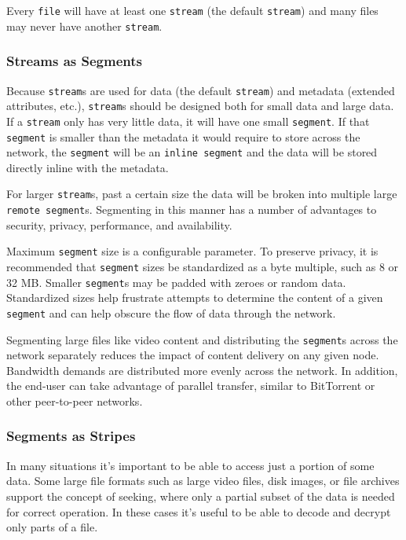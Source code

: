 \documentclass[a4paper,10pt]{article}
\newcommand{\x}[1]{{\tt #1}}
\begin{document}
Every \x{file} will have at least one \x{stream} (the default \x{stream}) and
many files may never have another \x{stream}.

\subsubsection{Streams as Segments}

Because \x{stream}s are used for data (the default \x{stream}) and metadata
(extended attributes, etc.), \x{stream}s should be designed both for small data
and large data. If a \x{stream} only has very little data, it will have one
small \x{segment}. If that \x{segment} is smaller than the metadata it would
require to store across the network, the \x{segment} will be an
\x{inline segment} and the data will be stored directly inline with the
metadata.

For larger \x{stream}s, past a certain size the data will be broken into
multiple large \x{remote segment}s. Segmenting in this manner has a number of
advantages to security, privacy, performance, and availability.

Maximum \x{segment} size is a configurable parameter. To preserve privacy, it is
recommended that \x{segment} sizes be standardized as a byte multiple, such as 8
or 32 MB. Smaller \x{segment}s may be padded with zeroes or random data.
Standardized sizes help frustrate attempts to determine the content of a given
\x{segment} and can help obscure the flow of data through the network.

Segmenting large files like video content and distributing the \x{segment}s
across the network separately reduces the impact of content delivery on any
given node.
Bandwidth demands are distributed more evenly across the network. In addition,
the end-user can take advantage of parallel transfer, similar to
BitTorrent\cite{24} or other peer-to-peer networks.

\subsubsection{Segments as Stripes}

In many situations it's important to be able to access just a portion of some
data. Some large file formats such as large video files, disk images, or file
archives support the concept of seeking, where only a partial subset of the
data is needed for correct operation. In these cases it's useful to be able to
decode and decrypt only parts of a file.
\end{document}
